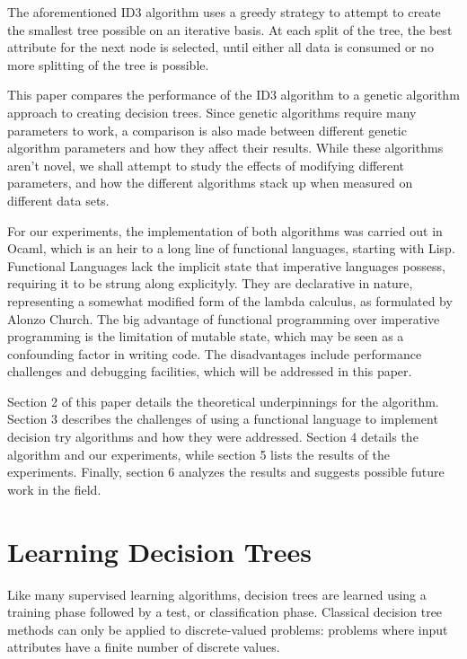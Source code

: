 \documentclass[12pt, letterpaper]{article}
\begin{document}
The aforementioned ID3\cite{quinlan1986induction} algorithm uses a greedy strategy to attempt to create the smallest tree possible on an iterative basis. At each split of the tree, the best attribute for the next node is selected, until either all data is consumed or no more splitting of the tree is possible.

This paper compares the performance of the ID3 algorithm to a genetic algorithm approach to creating decision trees. Since genetic algorithms require many parameters to work, a comparison is also made between different genetic algorithm parameters and how they affect their results. While these algorithms aren't novel, we shall attempt to study the effects of modifying different parameters, and how the different algorithms stack up when measured on different data sets. 

For our experiments, the implementation of both algorithms was carried out in Ocaml, which is an heir to a long line of functional languages, starting with Lisp\cite{hudak1989conception}. Functional Languages lack the implicit state that imperative languages possess, requiring it to be strung along explicityly. They are declarative in nature, representing a somewhat modified form of the lambda calculus, as formulated by Alonzo Church. The big advantage of functional programming over imperative programming is the limitation of mutable state, which may be seen as a confounding factor in writing code. The disadvantages include performance challenges and debugging facilities, which will be addressed in this paper.

Section 2 of this paper details the theoretical underpinnings for the algorithm. Section 3 describes the challenges of using a functional language to implement decision try algorithms and how they were addressed. Section 4 details the algorithm and our experiments, while section 5 lists the results of the experiments. Finally, section 6 analyzes the results and suggests possible future work in the field.

\section{Learning Decision Trees}
Like many supervised learning algorithms, decision trees are learned using a training phase followed by a test, or classification phase. Classical decision tree methods can only be applied to discrete-valued problems: problems where input attributes have a finite number of discrete values. 
\end{document}
